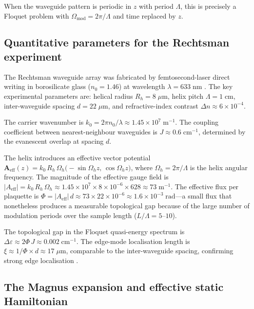 When the waveguide pattern is periodic in $z$ with period $\Lambda$,
this is precisely a Floquet problem with
$\Omega_{\mathrm{mod}}=2\pi/\Lambda$ and time replaced by $z$.

\subsection{Quantitative parameters for the Rechtsman experiment}
\label{sec:ch13-rechtsman-params}

The Rechtsman waveguide array was fabricated by femtosecond-laser
direct writing in borosilicate glass ($n_0=1.46$) at wavelength
$\lambda=633\;\mathrm{nm}$ \cite{rechtsman2013photonica}.  The key
experimental parameters are: helical radius $R_h=8\;\mu\mathrm{m}$,
helix pitch $\Lambda=1\;\mathrm{cm}$, inter-waveguide spacing
$d=22\;\mu\mathrm{m}$, and refractive-index contrast
$\Delta n\approx 6\times 10^{-4}$.

The carrier wavenumber is
$k_0=2\pi n_0/\lambda\approx 1.45\times 10^7\;\mathrm{m}^{-1}$.
The coupling coefficient between nearest-neighbour waveguides is
$J\approx 0.6\;\mathrm{cm}^{-1}$, determined by the evanescent
overlap at spacing $d$.

The helix introduces an effective vector potential
$\mathbf{A}_{\mathrm{eff}}(z)
=k_0\,R_h\,\Omega_h\bigl(-\sin\Omega_h z,\,\cos\Omega_h z\bigr)$,
where $\Omega_h=2\pi/\Lambda$ is the helix angular frequency.  The
magnitude of the effective gauge field is
$|A_{\mathrm{eff}}|=k_0\,R_h\,\Omega_h
\approx 1.45\times 10^7\times 8\times 10^{-6}\times 628
\approx 73\;\mathrm{m}^{-1}$.
The effective flux per plaquette is
$\Phi=|A_{\mathrm{eff}}|\,d\approx 73\times 22\times 10^{-6}
\approx 1.6\times 10^{-3}\;\mathrm{rad}$---a small flux that
nonetheless produces a measurable topological gap because of the
large number of modulation periods over the sample length
($L/\Lambda=5$--$10$).

The topological gap in the Floquet quasi-energy spectrum is
$\Delta\varepsilon\approx 2\Phi\,J\approx 0.002\;\mathrm{cm}^{-1}$.
The edge-mode localisation length is
$\xi\approx 1/\Phi\times d\approx 17\;\mu\mathrm{m}$, comparable
to the inter-waveguide spacing, confirming strong edge localisation
\cite{ozawa2018topological,maczewsky2017observation}.

\subsection{The Magnus expansion and effective static Hamiltonian}
\label{sec:ch13-magnus}

